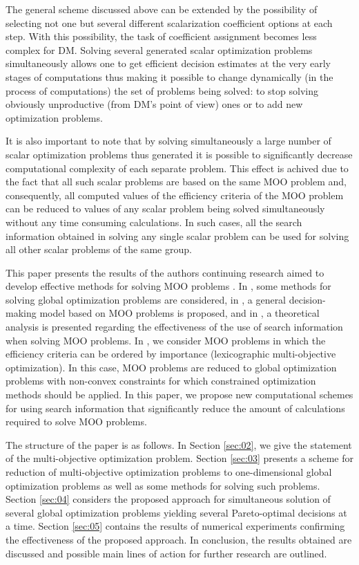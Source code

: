 \documentclass[runningheads]{llncs}
\begin{document}
The general scheme discussed above can be extended by the possibility of selecting not one but several different scalarization coefficient options at each step. With this possibility, the task of coefficient assignment becomes less complex for DM. Solving several generated scalar optimization problems simultaneously allows one to get efficient decision estimates at the very early stages of computations thus making it possible to change dynamically (in the process of computations) the set of problems being solved: to stop solving obviously unproductive (from DM's point of view) ones or to add new optimization problems.

It is also important to note that by solving simultaneously a large number of scalar optimization problems thus generated it is possible to significantly decrease computational complexity of each separate problem. This effect is achived due to the fact that all such scalar problems  are based on the same MOO problem and, consequently, all computed values of the efficiency criteria of the MOO problem can be reduced to values of any scalar problem being solved simultaneously without any time consuming calculations. In such cases, all the search information obtained in solving any single scalar problem can be used for solving all other scalar problems of the same group. 

This paper presents the results of the authors continuing research aimed to develop effective methods for solving MOO problems \cite{c35,c36,c37,c44}. In \cite{c35}, some methods for solving global optimization problems are considered, in \cite{c36},  a general decision-making model based on MOO problems is proposed, and in \cite{c37}, a theoretical analysis is presented regarding the effectiveness of the use of search information when solving MOO problems. In \cite{c44}, we consider MOO problems in which the efficiency criteria can be ordered by importance (lexicographic multi-objective optimization). In this case, MOO problems are reduced to global optimization problems with non-convex constraints for which constrained optimization methods should be applied. In this paper, we propose new computational schemes for using search information that significantly reduce the amount of calculations required to solve MOO problems.

The structure of the paper is as follows. In Section \ref{sec:02}, we give the statement of the multi-objective optimization problem. Section \ref{sec:03} presents a scheme for reduction of multi-objective optimization problems to one-dimensional global optimization problems as well as some methods for solving such problems. Section \ref{sec:04} considers the proposed approach for simultaneous solution of several global optimization problems yielding several Pareto-optimal decisions at a time. Section \ref{sec:05} contains the results of numerical experiments confirming the effectiveness of the proposed approach. In conclusion, the results obtained are discussed and possible main lines of action for further research are outlined.
\end{document}
